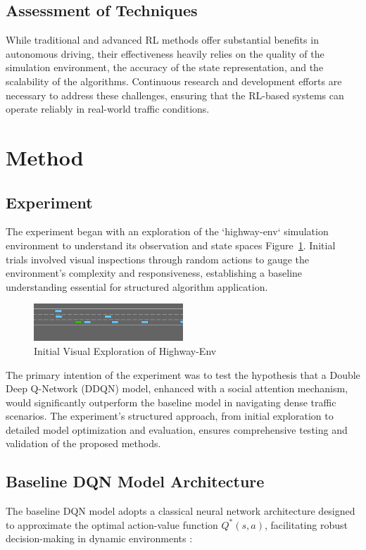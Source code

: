 \documentclass{article}
\begin{document}
\subsection{Assessment of Techniques}
While traditional and advanced RL methods offer substantial benefits in autonomous driving, their effectiveness heavily relies on the quality of the simulation environment, the accuracy of the state representation, and the scalability of the algorithms. Continuous research and development efforts are necessary to address these challenges, ensuring that the RL-based systems can operate reliably in real-world traffic conditions.

\section{Method}

\subsection{Experiment}
The experiment began with an exploration of the `highway-env` simulation environment to understand its observation and state spaces Figure~\ref{fig:initial_visual_inspection}. Initial trials involved visual inspections through random actions to gauge the environment's complexity and responsiveness, establishing a baseline understanding essential for structured algorithm application.

\begin{figure}[ht]
  \centering
  \includegraphics[width=0.5\textwidth]{./figures/highway_simulation_frame7.png}
  \caption{Initial Visual Exploration of Highway-Env}
  \label{fig:initial_visual_inspection}
\end{figure}

The primary intention of the experiment was to test the hypothesis that a Double Deep Q-Network (DDQN) model, enhanced with a social attention mechanism, would significantly outperform the baseline model in navigating dense traffic scenarios.
The experiment's structured approach, from initial exploration to detailed model optimization and evaluation, ensures comprehensive testing and validation of the proposed methods.

\subsection{Baseline DQN Model Architecture}
The baseline DQN model adopts a classical neural network architecture designed to approximate the optimal action-value function \( Q^*(s, a) \), facilitating robust decision-making in dynamic environments \citep{mnih2015humanlevel}:
\end{document}

